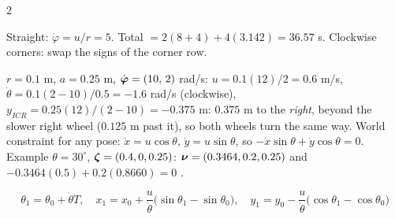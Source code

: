 \begin{multicols}{2}
\begin{worked}
Straight: $\dot\varphi=u/r=5$. Total $=2(8+4)+4(3.142)=\mathbf{36.57}$ s. Clockwise corners: swap the signs of the corner row.
\end{worked}
\begin{worked}
$r=0.1$ m, $a=0.25$ m, $\dot{\boldsymbol\varphi}=(10,\,2)$ rad/s: $u=0.1(12)/2=\mathbf{0.6}$ m/s, $\dot\theta=0.1(2-10)/0.5=\mathbf{-1.6}$ rad/s (clockwise), $y_{ICR}=0.25(12)/(2-10)=\mathbf{-0.375}$ m: $0.375$ m to the \emph{right}, beyond the slower right wheel ($0.125$ m past it), so both wheels turn the same way. World constraint for any pose: $\dot x=u\cos\theta$, $\dot y=u\sin\theta$, so $-\dot x\sin\theta+\dot y\cos\theta=0$. Example $\theta=30^\circ$, $\boldsymbol\zeta=(0.4,0,0.25)$: $\boldsymbol\nu=(0.3464,0.2,0.25)$ and $-0.3464(0.5)+0.2(0.8660)=0$ \checkmark.
\end{worked}
\begin{fbx}[Exact pose after time $T$ for constant $(u,\dot\theta)$, $v=0$ (\added; Practice Q10.2)]
\[\theta_1=\theta_0+\dot\theta T,\quad x_1=x_0+\frac u{\dot\theta}\big(\sin\theta_1-\sin\theta_0\big),\quad y_1=y_0-\frac u{\dot\theta}\big(\cos\theta_1-\cos\theta_0\big)\]
\end{fbx}


\end{multicols}
